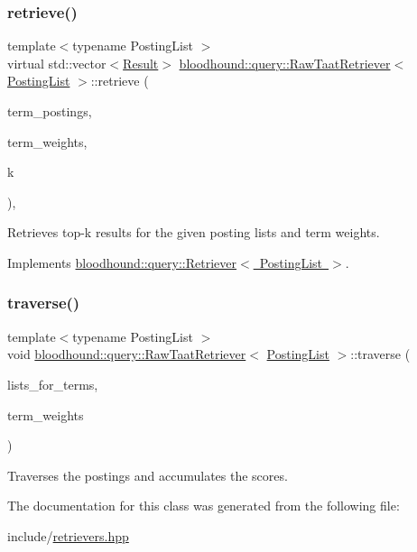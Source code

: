 \subsubsection{\texorpdfstring{retrieve()}{retrieve()}}
{\footnotesize\ttfamily template$<$typename Posting\+List $>$ \\
virtual std\+::vector$<$\mbox{\hyperlink{structbloodhound_1_1query_1_1Result}{Result}}$>$ \mbox{\hyperlink{classbloodhound_1_1query_1_1RawTaatRetriever}{bloodhound\+::query\+::\+Raw\+Taat\+Retriever}}$<$ \mbox{\hyperlink{classbloodhound_1_1PostingList}{Posting\+List}} $>$\+::retrieve (\begin{DoxyParamCaption}\item[{const std\+::vector$<$ \mbox{\hyperlink{classbloodhound_1_1PostingList}{Posting\+List}} $>$ \&}]{term\+\_\+postings,  }\item[{const std\+::vector$<$ \mbox{\hyperlink{structbloodhound_1_1Score}{Score}} $>$ \&}]{term\+\_\+weights,  }\item[{std\+::size\+\_\+t}]{k }\end{DoxyParamCaption})\hspace{0.3cm}{\ttfamily [inline]}, {\ttfamily [virtual]}}



Retrieves top-\/k results for the given posting lists and term weights. 



Implements \mbox{\hyperlink{classbloodhound_1_1query_1_1Retriever_ae3c6a4628c5580e620c213b3dcd47c2b}{bloodhound\+::query\+::\+Retriever$<$ Posting\+List $>$}}.

\mbox{\label{classbloodhound_1_1query_1_1RawTaatRetriever_a70007a6dd5213e9c28266e38b424ba20}} 
\subsubsection{\texorpdfstring{traverse()}{traverse()}}
{\footnotesize\ttfamily template$<$typename Posting\+List $>$ \\
void \mbox{\hyperlink{classbloodhound_1_1query_1_1RawTaatRetriever}{bloodhound\+::query\+::\+Raw\+Taat\+Retriever}}$<$ \mbox{\hyperlink{classbloodhound_1_1PostingList}{Posting\+List}} $>$\+::traverse (\begin{DoxyParamCaption}\item[{const std\+::vector$<$ \mbox{\hyperlink{classbloodhound_1_1PostingList}{Posting\+List}} $>$ \&}]{lists\+\_\+for\+\_\+terms,  }\item[{const std\+::vector$<$ \mbox{\hyperlink{structbloodhound_1_1Score}{Score}} $>$ \&}]{term\+\_\+weights }\end{DoxyParamCaption})\hspace{0.3cm}{\ttfamily [inline]}}



Traverses the postings and accumulates the scores. 



The documentation for this class was generated from the following file\+:\begin{DoxyCompactItemize}
\item 
include/\mbox{\hyperlink{retrievers_8hpp}{retrievers.\+hpp}}\end{DoxyCompactItemize}
